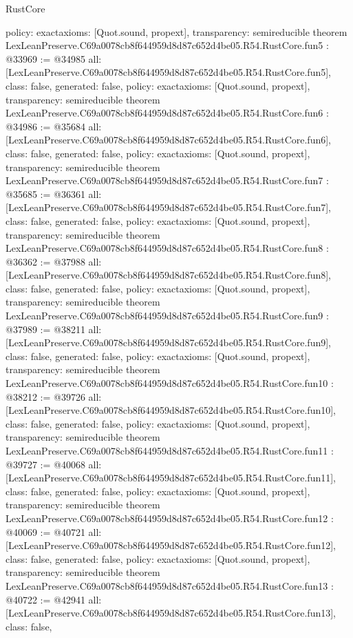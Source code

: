 \begin{lexlean}{RustCore}
\begin{coremodule}
{  policy: exact{axioms: [Quot.sound, propext]},
  transparency: semireducible
}
theorem LexLeanPreserve.C69a0078cb8f644959d8d87c652d4be05.R54.RustCore.fun5 : @33969 := @34985 {
  all: [LexLeanPreserve.C69a0078cb8f644959d8d87c652d4be05.R54.RustCore.fun5],
  class: false,
  generated: false,
  policy: exact{axioms: [Quot.sound, propext]},
  transparency: semireducible
}
theorem LexLeanPreserve.C69a0078cb8f644959d8d87c652d4be05.R54.RustCore.fun6 : @34986 := @35684 {
  all: [LexLeanPreserve.C69a0078cb8f644959d8d87c652d4be05.R54.RustCore.fun6],
  class: false,
  generated: false,
  policy: exact{axioms: [Quot.sound, propext]},
  transparency: semireducible
}
theorem LexLeanPreserve.C69a0078cb8f644959d8d87c652d4be05.R54.RustCore.fun7 : @35685 := @36361 {
  all: [LexLeanPreserve.C69a0078cb8f644959d8d87c652d4be05.R54.RustCore.fun7],
  class: false,
  generated: false,
  policy: exact{axioms: [Quot.sound, propext]},
  transparency: semireducible
}
theorem LexLeanPreserve.C69a0078cb8f644959d8d87c652d4be05.R54.RustCore.fun8 : @36362 := @37988 {
  all: [LexLeanPreserve.C69a0078cb8f644959d8d87c652d4be05.R54.RustCore.fun8],
  class: false,
  generated: false,
  policy: exact{axioms: [Quot.sound, propext]},
  transparency: semireducible
}
theorem LexLeanPreserve.C69a0078cb8f644959d8d87c652d4be05.R54.RustCore.fun9 : @37989 := @38211 {
  all: [LexLeanPreserve.C69a0078cb8f644959d8d87c652d4be05.R54.RustCore.fun9],
  class: false,
  generated: false,
  policy: exact{axioms: [Quot.sound, propext]},
  transparency: semireducible
}
theorem LexLeanPreserve.C69a0078cb8f644959d8d87c652d4be05.R54.RustCore.fun10 : @38212 := @39726 {
  all: [LexLeanPreserve.C69a0078cb8f644959d8d87c652d4be05.R54.RustCore.fun10],
  class: false,
  generated: false,
  policy: exact{axioms: [Quot.sound, propext]},
  transparency: semireducible
}
theorem LexLeanPreserve.C69a0078cb8f644959d8d87c652d4be05.R54.RustCore.fun11 : @39727 := @40068 {
  all: [LexLeanPreserve.C69a0078cb8f644959d8d87c652d4be05.R54.RustCore.fun11],
  class: false,
  generated: false,
  policy: exact{axioms: [Quot.sound, propext]},
  transparency: semireducible
}
theorem LexLeanPreserve.C69a0078cb8f644959d8d87c652d4be05.R54.RustCore.fun12 : @40069 := @40721 {
  all: [LexLeanPreserve.C69a0078cb8f644959d8d87c652d4be05.R54.RustCore.fun12],
  class: false,
  generated: false,
  policy: exact{axioms: [Quot.sound, propext]},
  transparency: semireducible
}
theorem LexLeanPreserve.C69a0078cb8f644959d8d87c652d4be05.R54.RustCore.fun13 : @40722 := @42941 {
  all: [LexLeanPreserve.C69a0078cb8f644959d8d87c652d4be05.R54.RustCore.fun13],
  class: false,
}
\end{coremodule}
\end{lexlean}
